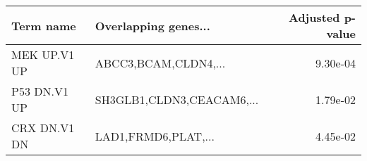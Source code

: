 \begin{tabular}{llr}
\toprule
   Term name &      Overlapping genes... &  Adjusted p-value \\
\midrule
MEK UP.V1 UP &      ABCC3,BCAM,CLDN4,... &          9.30e-04 \\
P53 DN.V1 UP & SH3GLB1,CLDN3,CEACAM6,... &          1.79e-02 \\
CRX DN.V1 DN &       LAD1,FRMD6,PLAT,... &          4.45e-02 \\
\bottomrule
\end{tabular}
